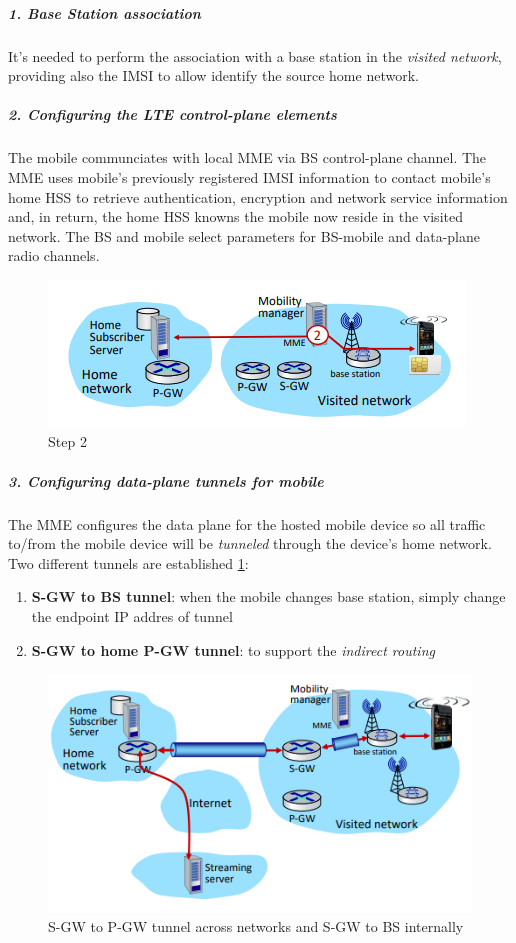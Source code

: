 \documentclass[10pt,a4paper]{report}
\theoremstyle{definition}
\begin{document}
\subparagraph{1. Base Station association}
It's needed to perform the association with a base station in the \textit{visited network}, providing also the IMSI to allow identify the source home network.
\subparagraph{2. Configuring the LTE control-plane elements}
The mobile communciates with local MME via BS control-plane channel. The MME uses mobile's previously registered IMSI information to contact mobile's home HSS to retrieve authentication, encryption and network service information and, in return, the home HSS knowns the mobile now reside in the visited network. The BS and mobile select parameters for BS-mobile and data-plane radio channels.

\begin{figure}[h]
	\centering\includegraphics[scale=0.70]{images/Pasted image 20230322120641.png}
	\caption{Step 2}
\end{figure}

\subparagraph{3. Configuring data-plane tunnels for mobile}
The MME configures the data plane for the hosted mobile device so all traffic to/from the mobile device will be \textit{tunneled} through the device's home network. 
Two different tunnels are established \ref{double-tunneling}:
\begin{enumerate}
	
	\item \textbf{S-GW to BS tunnel}: when the mobile changes base station, simply change the endpoint IP addres of tunnel
	\item \textbf{S-GW to home P-GW tunnel}: to support the \textit{indirect routing}
\end{enumerate}
 
\begin{figure}[h]
	\centering\includegraphics[scale=0.50]{images/Pasted image 20230322120711.png}
	\caption{S-GW to P-GW tunnel across networks and S-GW to BS internally}
	\label{double-tunneling}
\end{figure}
\end{document}
